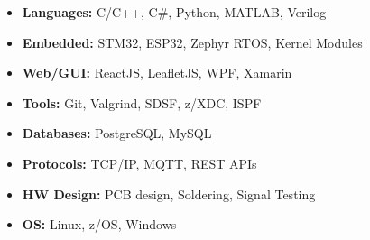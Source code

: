 \begin{multicols}{2}
\begin{itemize}[leftmargin=*]
  \item \textbf{Languages:} C/C++, C#, Python, MATLAB, Verilog
  \item \textbf{Embedded:} STM32, ESP32, Zephyr RTOS, Kernel Modules
  \item \textbf{Web/GUI:} ReactJS, LeafletJS, WPF, Xamarin
  \item \textbf{Tools:} Git, Valgrind, SDSF, z/XDC, ISPF
  \item \textbf{Databases:} PostgreSQL, MySQL
  \item \textbf{Protocols:} TCP/IP, MQTT, REST APIs
  \item \textbf{HW Design:} PCB design, Soldering, Signal Testing
  \item \textbf{OS:} Linux, z/OS, Windows
\end{itemize}
\end{multicols}
